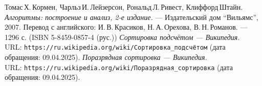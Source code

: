 \begin{thebibliography}{99}
Томас\,Х.\,Кормен, Чарльз\,И.\,Лейзерсон, Рональд\,Л.\,Ривест, Клиффорд\,Штайн.
{\itshape Алгоритмы: построение и анализ, 2-е издание.} --- Издательский дом \enquote{Вильямс}, 2007. Перевод с английского: И.\,В.\,Красиков, Н.\,А.\,Орехова, В.\,Н.\,Романов. --- 1296 с. (ISBN 5-8459-0857-4 (рус.))
{\itshape Сортировка подсчётом — Википедия.} \\URL: \texttt{https://ru.wikipedia.org/wiki/Сортировка\_подсчётом} (дата обращения: 09.04.2025).
{\itshape Поразрядная сортировка — Википедия.} \\URL: \texttt{https://ru.wikipedia.org/wiki/Поразрядная\_сортировка} (дата обращения: 09.04.2025).
\end{thebibliography}
\pagebreak


